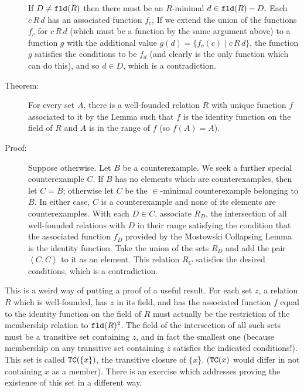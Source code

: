 \documentclass[12pt]{book}
\begin{document}
\begin{description}
If $D \neq {\tt fld}(R)$ then there must be an $R$-minimal $d \in {\tt fld}(R) -D$.  Each $c \, R \, d$ has an associated function $f_c$,
If we extend the union of the functions $f_c$ for $c \, R\,d$ (which must be a function by the same argument above) to a function $g$ with the additional value $g(d) = \{f_c(c) \mid c \, R \, d\}$, the function $g$ satisfies the conditions to be $f_d$ (and clearly is the only function which can do this), and so $d \in D$, which is a contradiction.

\item[Theorem:]  For every set $A$, there is a well-founded relation $R$ with unique function $f$ associated to it by the Lemma such that
$f$ is the identity function on the field of $R$ and $A$ is in the range of $f$ (so $f(A)=A$).

\item[Proof:]  Suppose otherwise.  Let $B$ be a counterexample.  We seek a further special counterexample $C$.  If $B$ has no elements which are counterexamples, then let $C=B$;  otherwise let $C$ be the $\in$-minimal counterexample belonging to $B$.  In either case, $C$ is a counterexample
and none of its elements are counterexamples.  With each $D \in C$, associate $R_D$, the intersection of all well-founded relations with $D$ in their range satisfying the condition that the associated function $f_D$ provided by the Mostowski Collapsing Lemma is the  identity function.  Take the union of the sets $R_D$ and add the pair $\left<C,C\right>$ to it as an element.  This relation $R_C$ satisfies the desired conditions, which is a contradiction.

\end{description}

This is a weird way of putting a proof of a useful result.  For each set $z$, a relation $R$ which is well-founded, has $z$ in its field,
and has the associated function $f$ equal to the identity function on the field of $R$ must actually be the restriction of the membership relation to ${\tt fld}(R)^2$.
The field of the intersection of all such sets must be a transitive set containing $z$, and in fact the smallest one (because membership on any transitive set containing $z$ satisfies the indicated conditions!).  This set is called ${\tt TC}(\{x\})$, the transitive closure of $\{x$\}. (${\tt TC}(x)$ would differ in not containing $x$ as a member).  There is an exercise which addresses proving the existence of this set in a different way.
\end{document}
